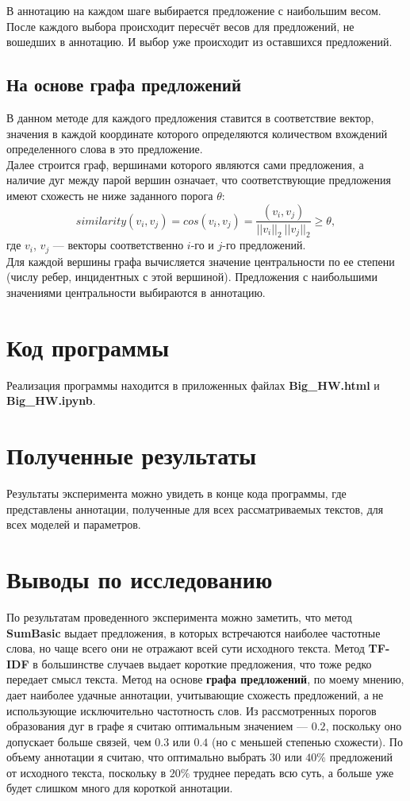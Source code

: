 \documentclass[oneside,final,12pt]{article}
\begin{document}
В аннотацию на каждом шаге выбирается предложение с наибольшим весом. После каждого выбора происходит пересчёт весов для предложений, не вошедших в аннотацию. И выбор уже происходит из оставшихся предложений.

\subsection{На основе графа предложений}

В данном методе для каждого предложения ставится в соответствие вектор, значения в каждой координате которого определяются количеством вхождений определенного слова в это предложение.\\

Далее строится граф, вершинами которого являются сами предложения, а наличие дуг между парой вершин означает, что соответствующие предложения имеют схожесть не ниже заданного порога $\theta$:
$$
similarity(v_i, v_j) = cos(v_i, v_j) = \frac{(v_i, v_j)}{||v_i||_2~||v_j||_2} \geq \theta,
$$
где $v_i$, $v_j$ --- векторы соответственно $i$-го и $j$-го предложений.\\

Для каждой вершины графа вычисляется значение центральности по ее степени (числу ребер, инцидентных с этой вершиной). Предложения с наибольшими значениями центральности       выбираются в аннотацию.

\section{Код программы}

Реализация программы находится в приложенных файлах \textbf{Big\_HW.html} и \textbf{Big\_HW.ipynb}.

\section{Полученные результаты}

Результаты эксперимента можно увидеть в конце кода программы, где представлены аннотации, полученные для всех рассматриваемых текстов, для всех моделей и параметров.

\section{Выводы по исследованию}

По результатам проведенного эксперимента можно заметить, что метод \textbf{SumBasic} выдает предложения, в которых встречаются наиболее частотные слова, но чаще всего они не отражают всей сути исходного текста. Метод \textbf{TF-IDF} в большинстве случаев выдает короткие предложения, что тоже редко передает смысл текста. Метод на основе \textbf{графа предложений}, по моему мнению, дает наиболее удачные аннотации, учитывающие схожесть предложений, а не использующие исключительно частотность слов. Из рассмотренных порогов образования дуг в графе я считаю оптимальным значением --- $0.2$, поскольку оно допускает больше связей, чем $0.3$ или $0.4$ (но с меньшей степенью схожести). По объему аннотации я считаю, что оптимально выбрать $30$ или $40\%$ предложений от исходного текста, поскольку в $20\%$ труднее передать всю суть, а больше уже будет слишком много для короткой аннотации.
\end{document}
